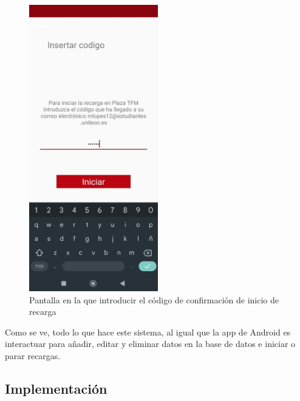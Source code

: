 \documentclass[12pt,a4paper,onecolumn,oneside]{report}
\begin{document}
\begin{figure}[H] 
\centering
  \includegraphics[width=0.5\textwidth]{figuras/design8.png}
  \caption[Pantalla en la que introducir el código de confirmación de inicio de recarga]{Pantalla en la que introducir el código de confirmación de inicio de recarga\\
  }
  \label{fig:design8}
\end{figure}

Como se ve, todo lo que hace este sistema, al igual que la app de Android es interactuar para añadir, editar y eliminar datos en la base de datos e iniciar o parar recargas.


\subsection{Implementación}
\end{document}
